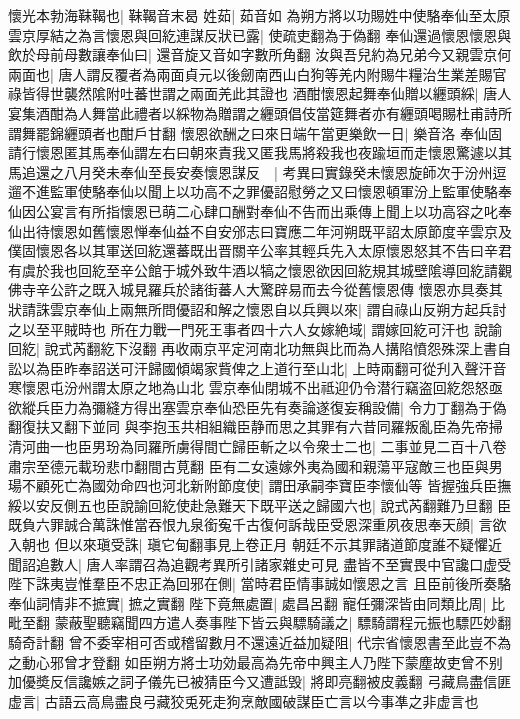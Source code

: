 懷光本勃海靺鞨也|{
	靺鞨音末曷}
姓茹|{
	茹音如}
為朔方將以功賜姓中使駱奉仙至太原雲京厚結之為言懷恩與回紇連謀反狀已露|{
	使疏吏翻為于偽翻}
奉仙還過懷恩懷恩與飲於母前母數讓奉仙曰|{
	還音旋又音如字數所角翻}
汝與吾兒約為兄弟今又親雲京何兩面也|{
	唐人謂反覆者為兩面貞元以後劒南西山白狗等羌内附賜牛糧治生業差賜官祿皆得世襲然隂附吐蕃世謂之兩面羌此其證也}
酒酣懷恩起舞奉仙贈以纒頭綵|{
	唐人宴集酒酣為人舞當此禮者以綵物為贈謂之纒頭倡伎當筵舞者亦有纒頭喝賜杜甫詩所謂舞罷錦纒頭者也酣戶甘翻}
懷恩欲酬之曰來日端午當更樂飲一日|{
	樂音洛}
奉仙固請行懷恩匿其馬奉仙謂左右曰朝來責我又匿我馬將殺我也夜踰垣而走懷恩驚遽以其馬追還之八月癸未奉仙至長安奏懷恩謀反　|{
	考異曰實錄癸未懷恩旋師次于汾州逗遛不進監軍使駱奉仙以聞上以功高不之罪優詔慰勞之又曰懷恩頓軍汾上監軍使駱奉仙因公宴言有所指懷恩已萌二心肆口酬對奉仙不告而出乘傳上聞上以功高容之叱奉仙出待懷恩如舊懷恩惮奉仙益不自安邠志曰寶應二年河朔既平詔太原節度辛雲京及僕固懷恩各以其軍送回紇還蕃既出晋關辛公率其輕兵先入太原懷恩怒其不告曰辛君有虞於我也回紇至辛公館于城外致牛酒以犒之懷恩欲因回紇規其城壁隂導回紇請觀佛寺辛公許之既入城見羅兵於諸街蕃人大驚辟易而去今從舊懷恩傳}
懷恩亦具奏其狀請誅雲京奉仙上兩無所問優詔和解之懷恩自以兵興以來|{
	謂自祿山反朔方起兵討之以至平賊時也}
所在力戰一門死王事者四十六人女嫁絶域|{
	謂嫁回紇可汗也}
說諭回紇|{
	說式芮翻紇下沒翻}
再收兩京平定河南北功無與比而為人搆陷憤怨殊深上書自訟以為臣昨奉詔送可汗歸國傾竭家貲俾之上道行至山北|{
	上時兩翻可從刋入聲汗音寒懷恩屯汾州謂太原之地為山北}
雲京奉仙閉城不出祗迎仍令潜行竊盗回紇怨怒亟欲縱兵臣力為彌縫方得出塞雲京奉仙恐臣先有奏論遂復妄稱設備|{
	令力丁翻為于偽翻復扶又翻下並同}
與李抱玉共相組織臣静而思之其罪有六昔同羅叛亂臣為先帝掃清河曲一也臣男玢為同羅所虜得間亡歸臣斬之以令衆士二也|{
	二事並見二百十八卷肅宗至德元載玢悲巾翻間古莧翻}
臣有二女遠嫁外夷為國和親蕩平寇敵三也臣與男瑒不顧死亡為國効命四也河北新附節度使|{
	謂田承嗣李寶臣李懷仙等}
皆握強兵臣撫綏以安反側五也臣說諭回紇使赴急難天下既平送之歸國六也|{
	說式芮翻難乃旦翻}
臣既負六罪誠合萬誅惟當吞恨九泉銜寃千古復何訴哉臣受恩深重夙夜思奉天顔|{
	言欲入朝也}
但以來瑱受誅|{
	瑱它甸翻事見上卷正月}
朝廷不示其罪諸道節度誰不疑懼近聞詔追數人|{
	唐人率謂召為追觀考異所引諸家雜史可見}
盡皆不至實畏中官讒口虚受陛下誅夷豈惟羣臣不忠正為回邪在側|{
	當時君臣情事誠如懷恩之言}
且臣前後所奏駱奉仙詞情非不摭實|{
	摭之實翻}
陛下竟無處置|{
	處昌呂翻}
寵任彌深皆由同類比周|{
	比毗至翻}
蒙蔽聖聽竊聞四方遣人奏事陛下皆云與驃騎議之|{
	驃騎謂程元振也驃匹妙翻騎奇計翻}
曾不委宰相可否或稽留數月不還遠近益加疑阻|{
	代宗省懷恩書至此豈不為之動心邪曾才登翻}
如臣朔方將士功効最高為先帝中興主人乃陛下蒙塵故吏曾不别加優奬反信讒嫉之詞子儀先已被猜臣今又遭詆毁|{
	將即亮翻被皮義翻}
弓藏鳥盡信匪虚言|{
	古語云高鳥盡良弓藏狡兎死走狗烹敵國破謀臣亡言以今事凖之非虚言也}
